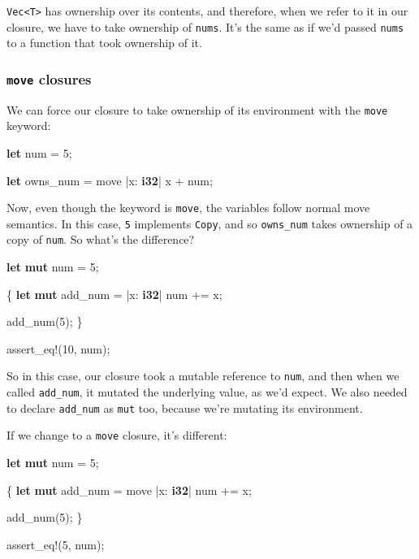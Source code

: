 \documentclass[a4paper,]{book}
\newenvironment{Shaded}{\begin{snugshade}}{\end{snugshade}}
\newcommand{\KeywordTok}[1]{\textcolor[rgb]{0.13,0.29,0.53}{\textbf{{#1}}}}
\newcommand{\DecValTok}[1]{\textcolor[rgb]{0.00,0.00,0.81}{{#1}}}
\newcommand{\OtherTok}[1]{\textcolor[rgb]{0.56,0.35,0.01}{{#1}}}
\newcommand{\NormalTok}[1]{{#1}}
\begin{document}
\texttt{Vec\textless{}T\textgreater{}} has ownership over its contents,
and therefore, when we refer to it in our closure, we have to take
ownership of \texttt{nums}. It's the same as if we'd passed
\texttt{nums} to a function that took ownership of it.

\subsubsection{\texorpdfstring{\texttt{move}
closures}{move closures}}\label{move-closures}

We can force our closure to take ownership of its environment with the
\texttt{move} keyword:

\begin{Shaded}
\begin{Highlighting}[]
\KeywordTok{let} \NormalTok{num = }\DecValTok{5}\NormalTok{;}

\KeywordTok{let} \NormalTok{owns_num = move |x: }\KeywordTok{i32}\NormalTok{| x + num;}
\end{Highlighting}
\end{Shaded}

Now, even though the keyword is \texttt{move}, the variables follow
normal move semantics. In this case, \texttt{5} implements
\texttt{Copy}, and so \texttt{owns\_num} takes ownership of a copy of
\texttt{num}. So what's the difference?

\begin{Shaded}
\begin{Highlighting}[]
\KeywordTok{let} \KeywordTok{mut} \NormalTok{num = }\DecValTok{5}\NormalTok{;}

\NormalTok{\{ }
    \KeywordTok{let} \KeywordTok{mut} \NormalTok{add_num = |x: }\KeywordTok{i32}\NormalTok{| num += x;}

    \NormalTok{add_num(}\DecValTok{5}\NormalTok{);}
\NormalTok{\}}

\OtherTok{assert_eq!}\NormalTok{(}\DecValTok{10}\NormalTok{, num);}
\end{Highlighting}
\end{Shaded}

So in this case, our closure took a mutable reference to \texttt{num},
and then when we called \texttt{add\_num}, it mutated the underlying
value, as we'd expect. We also needed to declare \texttt{add\_num} as
\texttt{mut} too, because we're mutating its environment.

If we change to a \texttt{move} closure, it's different:

\begin{Shaded}
\begin{Highlighting}[]
\KeywordTok{let} \KeywordTok{mut} \NormalTok{num = }\DecValTok{5}\NormalTok{;}

\NormalTok{\{ }
    \KeywordTok{let} \KeywordTok{mut} \NormalTok{add_num = move |x: }\KeywordTok{i32}\NormalTok{| num += x;}

    \NormalTok{add_num(}\DecValTok{5}\NormalTok{);}
\NormalTok{\}}

\OtherTok{assert_eq!}\NormalTok{(}\DecValTok{5}\NormalTok{, num);}
\end{Highlighting}
\end{Shaded}
\end{document}
